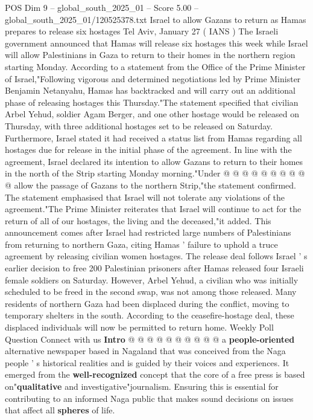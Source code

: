 \begin{textsample}{POS Dim 9 – global\_south\_2025\_01 – Score 5.00 – global\_south\_2025\_01/120525378.txt}  \label{ex:f9_pos_346}
Israel to allow Gazans to return as Hamas prepares to release six hostages Tel Aviv, January 27 ( IANS ) The Israeli government announced that Hamas will release six hostages this week while Israel will allow Palestinians in Gaza to return to their homes in the northern region starting Monday.
According to a statement from the Office of the Prime Minister of Israel,"Following vigorous and determined negotiations led by Prime Minister Benjamin Netanyahu, Hamas has backtracked and will carry out an additional phase of releasing hostages this Thursday."The statement specified that civilian Arbel Yehud, soldier Agam Berger, and one other hostage would be released on Thursday, with three additional hostages set to be released on Saturday.
Furthermore, Israel stated it had received a status list from Hamas regarding all hostages due for release in the initial phase of the agreement.
In line with the agreement, Israel declared its intention to allow Gazans to return to their homes in the north of the Strip starting Monday morning."Under @ @ @ @ @ @ @ @ @ @ allow the passage of Gazans to the northern Strip,"the statement confirmed.
The statement emphasised that Israel will not tolerate any violations of the agreement."The Prime Minister reiterates that Israel will continue to act for the return of all of our hostages, the living and the deceased,"it added.
This announcement comes after Israel had restricted large numbers of Palestinians from returning to northern Gaza, citing Hamas ' failure to uphold a truce agreement by releasing civilian women hostages.
The release deal follows Israel ' s earlier decision to free 200 Palestinian prisoners after Hamas released four Israeli female soldiers on Saturday.
However, Arbel Yehud, a civilian who was initially scheduled to be freed in the second swap, was not among those released.
Many residents of northern Gaza had been displaced during the conflict, moving to temporary shelters in the south.
According to the ceasefire-hostage deal, these displaced individuals will now be permitted to return home.
Weekly Poll Question Connect with us \textbf{Intro} @ @ @ @ @ @ @ @ @ @ a \textbf{people-oriented} alternative newspaper based in Nagaland that was conceived from the Naga people ' s historical realities and is guided by their voices and experiences.
It emerged from the \textbf{well-recognized} concept that the core of a free press is based on"\textbf{qualitative} and investigative"journalism.
Ensuring this is essential for contributing to an informed Naga public that makes sound decisions on issues that affect all \textbf{spheres} of life.

\end{textsample}
